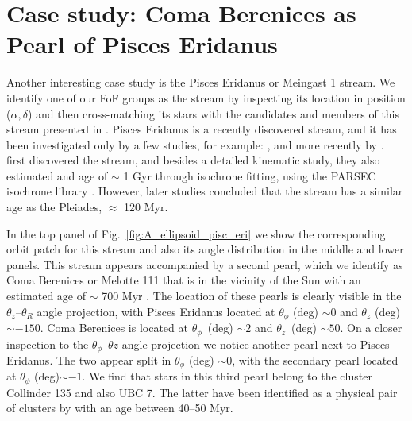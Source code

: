 \documentclass[twocolumn]{aastex631}
\begin{document}
\section{Case study: Coma Berenices as Pearl of Pisces Eridanus}
\label{sec:Appendix_B}

Another interesting case study is the Pisces Eridanus or Meingast 1 stream. We identify one of our FoF groups as the stream by inspecting its location in position ($\alpha, \delta$) and then cross-matching its stars with the candidates and members of this stream presented in \citet{2019AJ....158...77C}. Pisces Eridanus is a recently discovered stream, and it has been investigated only by a few studies, for example: \citet{2019A&A...622L..13M}, \citet{2019AJ....158...77C} and more recently by \citet{2020MNRAS.496.2422H,2020A&A...639A..64R}. \citet{2019A&A...622L..13M} first discovered the stream, and besides a detailed kinematic study, they also estimated and age of $\sim$ 1 Gyr through isochrone fitting, using the PARSEC isochrone library \citep{2012MNRAS.427..127B}. However, later studies \citep{2019AJ....158...77C,2020A&A...639A..64R} concluded that the stream has a similar age as the Pleiades, $\approx$ 120 Myr.

In the top panel of Fig.~\ref{fig:A_ellipsoid_pisc_eri} we show the corresponding orbit patch for this stream and also its angle distribution in the middle and lower panels. This stream appears accompanied by a second pearl, which we identify as Coma Berenices or Melotte 111 that is in the vicinity of the Sun with an estimated age of $\sim$ 700 Myr \citep{2019A&A...624L..11F, Tang2019}. The location of these pearls is clearly visible in the $\theta_{z}$--$\theta_{R}$ angle projection, with Pisces Eridanus located at $\theta_{\phi}$ (deg) $\sim 0$ and $\theta_{z}$ (deg) $\sim -150$. Coma Berenices is located at $\theta_{\phi}$\, (deg) $\sim 2$ and $\theta_{z}$\, (deg) $\sim 50$. On a closer inspection to the $\theta_{\phi}$--$\theta{z}$ angle projection we notice another pearl next to Pisces Eridanus. The two appear split in $\theta_{\phi}$ (deg) $\sim 0$, with the secondary pearl located at $\theta_{\phi}$ (deg)$\sim -1$. We find that stars in this third pearl belong to the cluster Collinder 135 and also UBC 7. The latter have been identified as a physical pair of clusters by \citet{2020A&A...642L...4K} with an age between 40--50 Myr. 
\end{document}
